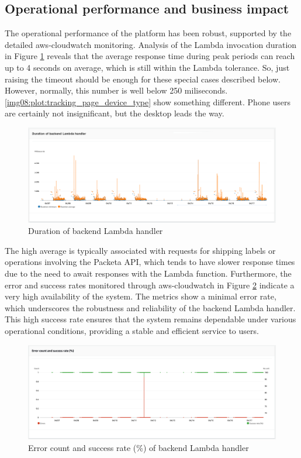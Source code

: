 \subsection{Operational performance and business impact}
\label{subsec:operational-performance-business-impact}
The operational performance of the platform has been robust, supported by the detailed \gls{aws-cloudwatch} monitoring.
Analysis of the Lambda invocation duration in Figure \ref{img08:plot:lambda_handler_durations} reveals that the average response time during peak periods can reach up to 4 seconds on average, which is still within the Lambda tolerance.
So, just raising the timeout should be enough for these special cases described below.
However, normally, this number is well below 250 miliseconds.
\ref{img08:plot:tracking_page_device_type} show something different.
Phone users are certainly not insignificant, but the desktop leads the way.
\begin{figure}[H]\centering
\includegraphics[width=140mm]{img/chap08/lambda_handler_durations.png}
\caption{Duration of backend Lambda handler}
\label{img08:plot:lambda_handler_durations}
\end{figure}
The high average is typically associated with requests for shipping labels or operations involving the Packeta API, which tends to have slower response times due to the need to await responses with the Lambda function.
Furthermore, the error and success rates monitored through \gls{aws-cloudwatch} in Figure \ref{img08:plot:lambda_handler_errors} indicate a very high availability of the system. The metrics show a minimal error rate, which underscores the robustness and reliability of the backend Lambda handler. This high success rate ensures that the system remains dependable under various operational conditions, providing a stable and efficient service to users.
\begin{figure}[H]\centering
\includegraphics[width=140mm]{img/chap08/lambda_handler_errors.png}
\caption{Error count and success rate (\%) of backend Lambda handler}
\label{img08:plot:lambda_handler_errors}
\end{figure}

